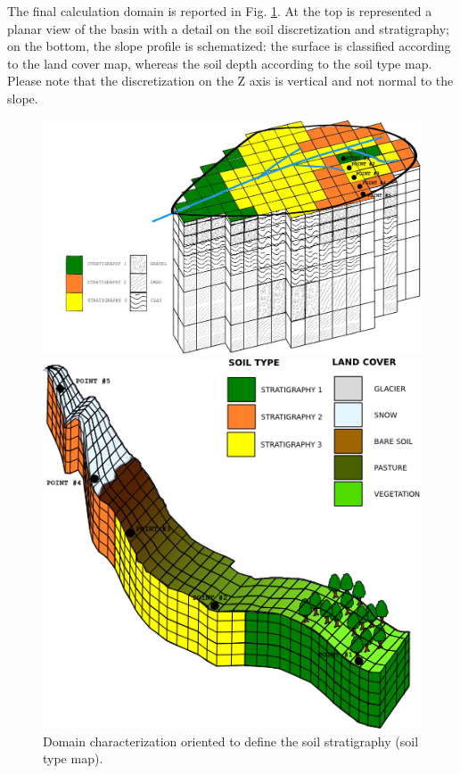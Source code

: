 The final calculation domain is reported in Fig. \ref{grid3Dversante_points}. At the top is represented a planar view of the basin with a detail on the soil discretization and stratigraphy; on the bottom, the slope profile is schematized: the surface is classified according to the land cover map, whereas the soil depth according to the soil type map.
Please note that the discretization on the Z axis is vertical and not normal to the slope.

\begin{figure}[tbp]
\begin{center}
\begin{minipage}[c]{0.3 \textheight}
\includegraphics[width=1.8 \textwidth]{./images/pic_domain/soil_type_stratigraphy.pdf}
\end{minipage}
\vspace{10 mm}
\begin{minipage}[c]{0.5 \textheight}
\centering
\includegraphics[width=0.9 \textwidth]{./images/pic_domain/grid3Dversante_points}
\end{minipage}
\caption{Domain characterization oriented to define the soil stratigraphy (soil type map).}
\label{grid3Dversante_points}
\end{center}
\end{figure}



